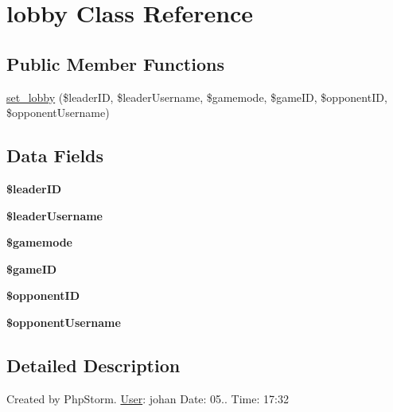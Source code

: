 \hypertarget{classlobby}{}\section{lobby Class Reference}
\label{classlobby}
\subsection*{Public Member Functions}
\begin{DoxyCompactItemize}
\item 
\hyperlink{classlobby_a0501effa0478716d61dbc830ae7ac0c0}{set\+\_\+lobby} (\$leader\+ID, \$leader\+Username, \$gamemode, \$game\+ID, \$opponent\+ID, \$opponent\+Username)
\end{DoxyCompactItemize}
\subsection*{Data Fields}
\begin{DoxyCompactItemize}
\item 
\mbox{\label{classlobby_ae011f12226aa240566aa5b17c6a905a4}} 
{\bfseries \$leader\+ID}
\item 
\mbox{\label{classlobby_a4c162cc429c50427e1e4aef5f7567efa}} 
{\bfseries \$leader\+Username}
\item 
\mbox{\label{classlobby_a3fd98457ff4f3251dfac6d6a01965f98}} 
{\bfseries \$gamemode}
\item 
\mbox{\label{classlobby_aa27e936ca36f62a3e0478528c5274356}} 
{\bfseries \$game\+ID}
\item 
\mbox{\label{classlobby_ad0db2a880e262730fabe6a221910aefc}} 
{\bfseries \$opponent\+ID}
\item 
\mbox{\label{classlobby_adf1f61ed1a8f7f727ad3b321bfd00cc1}} 
{\bfseries \$opponent\+Username}
\end{DoxyCompactItemize}


\subsection{Detailed Description}
Created by Php\+Storm. \hyperlink{class_user}{User}\+: johan Date\+: 05.. Time\+: 17\+:32 


